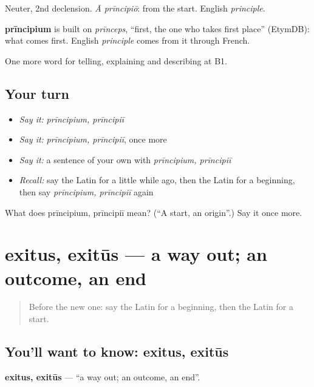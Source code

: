 Neuter, 2nd declension. \emph{Ā prīncipiō}: from the start. English \emph{principle}.

\begin{cousinweb}
\textbf{prīncipium} is built on \emph{prīnceps}, \textquotedblleft{}first, the one who takes first place\textquotedblright{} (EtymDB): what comes first. English \emph{principle} comes from it through French.
\end{cousinweb}

\begin{grammarlens}[title={What you've built}]
One more word for telling, explaining and describing at B1.
\end{grammarlens}

\subsection*{Your turn}
\begin{itemize}
\raggedright
  \item \emph{Say it:} \emph{prīncipium, prīncipiī}
  \item \emph{Say it:} \emph{prīncipium, prīncipiī}, once more
  \item \emph{Say it:} a sentence of your own with \emph{prīncipium, prīncipiī}
  \item \emph{Recall:} say the Latin for a little while ago, then the Latin for a beginning, then say \emph{prīncipium, prīncipiī} again
\end{itemize}

\begin{tcolorbox}[breakable,colback=teal!4,colframe=teal!35!black,title={Before you move on}]
What does prīncipium, prīncipiī mean? (\textquotedblleft{}A start, an origin\textquotedblright{}.) Say it once more.
\end{tcolorbox}
\section[exitus, exitūs]{exitus, exitūs — a way out; an outcome, an end}

\label{lesson:LA-C296-exitus}



\begin{quote}
Before the new one: say the Latin for a beginning, then the Latin for a start.
\end{quote}

\subsection*{You'll want to know: exitus, exitūs}
\textbf{exitus, exitūs} — \textquotedblleft{}a way out; an outcome, an end\textquotedblright{}.

